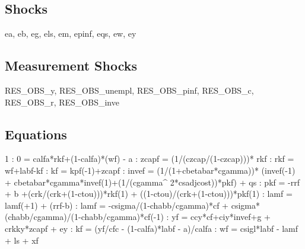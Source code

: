 \documentclass{article}%
\begin{document}
%
\subsection{Shocks}%
\label{subsec:Shocks}%
ea, eb, eg, els, em, epinf, eqs, ew, ey

%
\subsection{Measurement Shocks}%
\label{subsec:MeasurementShocks}%
RES\_OBS\_y, RES\_OBS\_unempl, RES\_OBS\_pinf, RES\_OBS\_c, RES\_OBS\_r, RES\_OBS\_inve

%
\subsection{Equations}%
\label{subsec:Equations}%
 1    :  0 =  calfa*rkf+(1{-}calfa)*(wf) {-} a\newline%
    :  zcapf =  (1/(czcap/(1{-}czcap)))* rkf\newline%
    :  rkf =  wf+labf{-}kf\newline%
    :  kf =  kpf({-}1)+zcapf\newline%
    :  invef = (1/(1+cbetabar*cgamma))* (invef({-}1) + cbetabar*cgamma*invef(1)+(1/(cgamma\^{} 2*csadjcost))*pkf) + qs\newline%
    :  pkf = {-}rrf + b  +(crk/(crk+(1{-}ctou)))*rkf(1) +  ((1{-}ctou)/(crk+(1{-}ctou)))*pkf(1)\newline%
    :  lamf = lamf(+1) + (rrf{-}b)\newline%
    :  lamf = {-}csigma/(1{-}chabb/cgamma)*cf + csigma*(chabb/cgamma)/(1{-}chabb/cgamma)*cf({-}1)\newline%
    :  yf = ccy*cf+ciy*invef+g  +  crkky*zcapf  + ey\newline%
   :  kf = (yf/cfc {-} (1{-}calfa)*labf {-} a)/calfa\newline%
   :  wf = csigl*labf {-} lamf + ls + xf\newline%
\newline%
\end{document}
